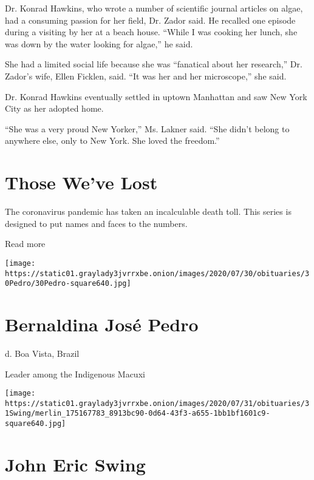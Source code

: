Dr. Konrad Hawkins, who wrote a number of scientific journal articles on
algae, had a consuming passion for her field, Dr. Zador said. He
recalled one episode during a visiting by her at a beach house. ``While
I was cooking her lunch, she was down by the water looking for algae,''
he said.

She had a limited social life because she was ``fanatical about her
research,'' Dr. Zador's wife, Ellen Ficklen, said. ``It was her and her
microscope,'' she said.

Dr. Konrad Hawkins eventually settled in uptown Manhattan and saw New
York City as her adopted home.

``She was a very proud New Yorker,'' Ms. Lakner said. ``She didn't
belong to anywhere else, only to New York. She loved the freedom.''

\href{https://www.nytimes3xbfgragh.onion/interactive/2020/obituaries/people-died-coronavirus-obituaries.html?action=click\&pgtype=Article\&state=default\&region=BELOW_MAIN_CONTENT\&context=covid_obits_promo}{}

\hypertarget{those-weve-lost}{%
\section{Those We've Lost}\label{those-weve-lost}}

The coronavirus pandemic has taken an incalculable death toll. This
series is designed to put names and faces to the numbers.

Read more

\texttt{[image: https://static01.graylady3jvrrxbe.onion/images/2020/07/30/obituaries/30Pedro/30Pedro-square640.jpg]}

\hypertarget{bernaldina-josuxe9-pedro}{%
\section{Bernaldina José Pedro}\label{bernaldina-josuxe9-pedro}}

d. Boa Vista, Brazil

Leader among the Indigenous Macuxi

\texttt{[image: https://static01.graylady3jvrrxbe.onion/images/2020/07/31/obituaries/31Swing/merlin\_175167783\_8913bc90-0d64-43f3-a655-1bb1bf1601c9-square640.jpg]}

\hypertarget{john-eric-swing}{%
\section{John Eric Swing}\label{john-eric-swing}}

